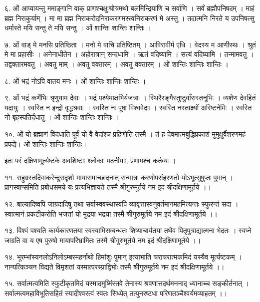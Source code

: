 ६. ओं आप्यायन्तु ममाङ्गानि वाक् प्राणश्चक्षुःश्रोत्रमथो बलमिन्द्रियाणि च सर्वाणि । सर्वं ब्रह्मौपनिषदम् । माहं ब्रह्म निराकुर्याम् । मा मा ब्रह्म निराकरोदनिराकरणमस्त्वनिराकरणं मे अस्तु । तदात्मनि निरते य उपनिषत्सु धर्मास्ते मयि सन्तु ते मयि सन्तु । ओं शान्तिः शान्तिः शान्तिः । 

७. ओं वाड् मे मनसि प्रतिष्ठिता । मनो मे वाचि प्रतिष्ठितम् । आविरावीर्म एधि । वेदस्य म आणीस्थः । श्रुतं मे मा प्रहासीः । अनेनाधीतेन । अहोरात्रान् सन्दधामि । ऋतं वदिष्यामि । सत्यं वदिष्यामि । तन्मामवतु । तद्वक्तारमवतु । अवतु माम् । अवतु वक्तारम् । अवतु वक्तारम् । ओं शान्तिः शान्तिः शान्तिः । 

८. ओं भद्रं नोऽपि वातय मनः । ओं शान्तिः शान्तिः शान्तिः । 

९. ओं भद्रं कर्णेभिः श्रृणुयाम देवाः । भद्रं पश्येमाक्षभिर्यजत्राः । स्थिरैरङ्गैस्तुष्टुवाँसस्तनूभिः । व्यशेण देवहितं यदायुः । स्वस्ति न इन्द्रो वृद्धश्रवाः । स्वस्ति नः पूषा विश्ववेदाः । स्वस्ति नस्ताक्ष्यों अरिष्टनेमिः । स्वस्ति नो बृहस्पतिर्दधातु । ओं शान्तिः शान्तिः शान्तिः ।

१०. ओं यो ब्रह्माणं विदधाति पूर्वं यो वै वेदांश्च प्रहिणोति तस्मै । तं ह देवमात्मबुद्धिप्रकाशं मुमुक्षुर्वैशरणमहं प्रपद्ये। ओं शान्तिः शान्तिः शान्तिः। 

इतः परं दक्षिणामूर्त्यष्टके अवशिष्टाः श्लोकाः पठनीयाः, प्रणामश्च कर्तव्यः । 

११. राहुग्रस्तदिवाकरेन्दुसदृशो मायासमाच्छादनात् 
सन्मात्रः करणोपसंहरणतो योऽभूत्सुषुप्तः पुमान् ।
प्रागस्वाप्समिति प्रबोधसमये यः प्रत्यभिज्ञायते 
तस्मै श्रीगुरुमूर्तये नम इदं श्रीदक्षिणामूर्तये ।।

१२. बाल्यादिष्वपि जाग्रदादिषु तथा सर्वास्ववस्थास्वपि 
व्यावृत्तास्वनुवर्तमानमहमित्यन्तः स्फुरन्तं सदा ।
स्वात्मानं प्रकटीकरोति भजतां यो मुद्रया भद्रया 
तस्मै श्रीगुरुमूर्तये नम इदं श्रीदक्षिणामूर्तये ।। 

१३. विश्वं पश्यति कार्यकारणतया स्वस्वामिसम्बन्धतः 
शिष्याचार्यतया तथैव पितृपुत्राद्यात्मना भेदतः ।
स्वप्ने जाग्रति वा य एष पुरुषो मायापरिभ्रामितः 
तस्मै श्रीगुरुमूर्तये नम इदं श्रीदक्षिणामूर्तये ।।  

१४. भूरम्भांस्यनलोऽनिलोऽम्बरमहर्नाथो हिमांशुः पुमान् 
इत्याभाति चराचरात्मकमिदं यस्यैव मूर्त्यष्टकम् ।
नान्यत्किञ्चन विद्यते विमृशतां यस्मात्परस्प्राद्विभोः 
तस्मै श्रीगुरुमूर्तये नम इदं श्रीदक्षिणामूर्तये ।। 

१५. सर्वात्मत्वमिति स्फुटीकृतमिदं यस्मादमुष्मिंस्तवे 
तेनास्य श्रवणात्तदर्थमननाद् ध्यानाच्च सङ्कीर्तनात् ।
सर्वात्मत्वमहाविभूतिसहितं स्यादीश्वरत्वं स्वतः 
सिध्येत् तत्पुनरष्टधा परिणतञ्चैश्वर्यमव्याहतम् ।। 

